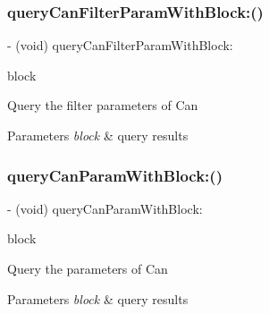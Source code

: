 \subsubsection{\texorpdfstring{query\+Can\+Filter\+Param\+With\+Block\+:()}{queryCanFilterParamWithBlock:()}}
{\footnotesize\ttfamily -\/ (void) query\+Can\+Filter\+Param\+With\+Block\+: \begin{DoxyParamCaption}\item[{(P\+V\+Query\+Can\+Filter\+Param\+Block)}]{block }\end{DoxyParamCaption}}

Query the filter parameters of Can


\begin{DoxyParams}{Parameters}
{\em block} & query results \\
\hline
\end{DoxyParams}
\mbox{\label{interface_p_v_mount_controller_a140de4207e581aa211dfa69e1aeaee16}} 
\subsubsection{\texorpdfstring{query\+Can\+Param\+With\+Block\+:()}{queryCanParamWithBlock:()}}
{\footnotesize\ttfamily -\/ (void) query\+Can\+Param\+With\+Block\+: \begin{DoxyParamCaption}\item[{(P\+V\+Query\+Can\+Param\+Block)}]{block }\end{DoxyParamCaption}}

Query the parameters of Can


\begin{DoxyParams}{Parameters}
{\em block} & query results \\
\hline
\end{DoxyParams}
\mbox{\label{interface_p_v_mount_controller_a6b71e325eb6505c4e3152209770edabe}} 
